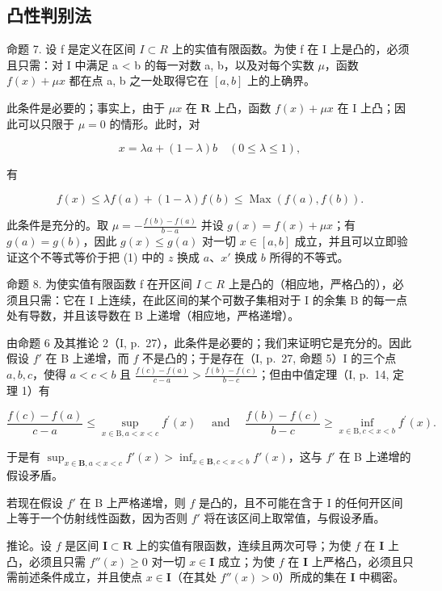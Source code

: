 \subsection{凸性判别法}

命题 7. 设 f 是定义在区间 \(I \subset R\) 上的实值有限函数。为使 f 在 I 上是凸的，必须且只需：对 I 中满足 a \textless{} b 的每一对数 a, b，以及对每个实数 \(\mu\)，函数 \(f(x) + \mu x\) 都在点 a, b 之一处取得它在 \([a, b]\) 上的上确界。

此条件是必要的；事实上，由于 \(\mu x\) 在 \(\mathbf{R}\) 上凸，函数 \(f(x) + \mu x\) 在 I 上凸；因此可以只限于 \(\mu = 0\) 的情形。此时，对

\[
x = \lambda a + (1 - \lambda) b \quad (0 \leqslant \lambda \leqslant 1),
\]

有

\[
f (x) \leqslant \lambda f (a) + (1 - \lambda) f (b) \leqslant \operatorname{Max} (f (a), f (b)).
\]

此条件是充分的。取 \(\mu = -\frac{f(b) - f(a)}{b - a}\) 并设 \(g(x) = f(x) + \mu x\)；有 \(g(a) = g(b)\)，因此 \(g(x) \leqslant g(a)\) 对一切 \(x \in [a, b]\) 成立，并且可以立即验证这个不等式等价于把 (1) 中的 \(z\) 换成 \(a\)、\(x'\) 换成 \(b\) 所得的不等式。

命题 8. 为使实值有限函数 f 在开区间 \(I \subset R\) 上是凸的（相应地，严格凸的），必须且只需：它在 I 上连续，在此区间的某个可数子集相对于 I 的余集 B 的每一点处有导数，并且该导数在 B 上递增（相应地，严格递增）。

由命题 6 及其推论 2（I, p.~27），此条件是必要的；我们来证明它是充分的。因此假设 \(f'\) 在 B 上递增，而 \(f\) 不是凸的；于是存在（I, p.~27, 命题 5）I 的三个点 \(a, b, c\)，使得 \(a < c < b\) 且 \(\frac{f(c) - f(a)}{c - a} > \frac{f(b) - f(c)}{b - c}\)；但由中值定理（I, p.~14, 定理 1）有

\[
\frac {f (c) - f (a)}{c - a} \leqslant \sup _ {x \in \mathrm{B}, a <   x <   c} f ^ {\prime} (x) \quad \text { and } \quad \frac {f (b) - f (c)}{b - c} \geqslant \inf _ {x \in \mathrm{B}, c <   x <   b} f ^ {\prime} (x).
\]

于是有 \(\sup_{x\in \mathbf{B},a < x < c}f'(x) > \inf_{x\in \mathbf{B},c < x < b}f'(x)\)，这与 \(f'\) 在 B 上递增的假设矛盾。

若现在假设 \(f'\) 在 B 上严格递增，则 \(f\) 是凸的，且不可能在含于 I 的任何开区间上等于一个仿射线性函数，因为否则 \(f'\) 将在该区间上取常值，与假设矛盾。

推论。设 \(f\) 是区间 \(\mathbf{I} \subset \mathbf{R}\) 上的实值有限函数，连续且两次可导；为使 \(f\) 在 \(\mathbf{I}\) 上凸，必须且只需 \(f''(x) \geqslant 0\) 对一切 \(x \in \mathbf{I}\) 成立；为使 \(f\) 在 \(\mathbf{I}\) 上严格凸，必须且只需前述条件成立，并且使点 \(x \in \mathbf{I}\)（在其处 \(f''(x) > 0\)）所成的集在 \(\mathbf{I}\) 中稠密。

